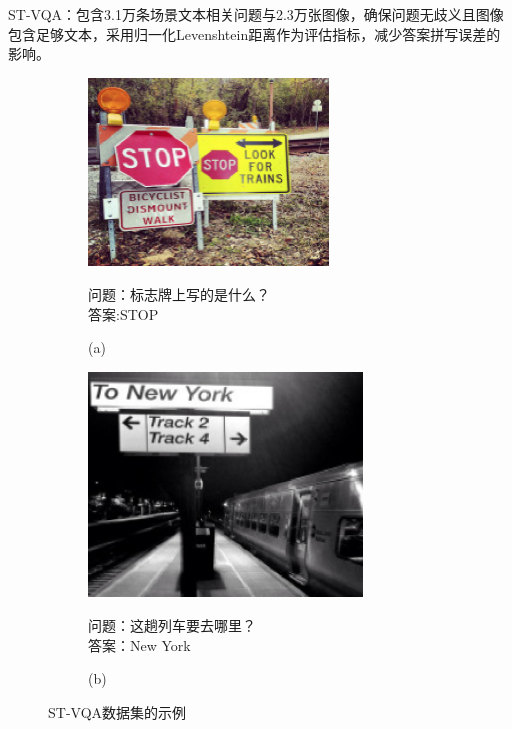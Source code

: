 \begin{enumerate}[nosep]
​ST-VQA\cite{biten2019scene}：包含3.1万条场景文本相关问题与2.3万张图像，确保问题无歧义且图像包含足够文本，采用归一化Levenshtein距离作为评估指标，减少答案拼写误差的影响。
\begin{figure}[h]
    \begin{subfigure}[b]{0.45\textwidth}
        \centering
        \includegraphics[width=0.7\textwidth, keepaspectratio]{figures/STVQA-A.png}
        \begin{center}
            \footnotesize 问题：标志牌上写的是什么？\\
            \footnotesize 答案:STOP\\
        \end{center}
        \caption*{(a)}
    \end{subfigure}
    \hfill
    \begin{subfigure}[b]{0.45\textwidth}
        \centering
        \includegraphics[width=0.8\textwidth, keepaspectratio]{figures/STVQA-B.png}
        \begin{center}
            \footnotesize 问题：这趟列车要去哪里？\\
            \footnotesize 答案：New York\\
        \end{center}
        \caption*{(b)}
    \end{subfigure}
    \caption{ST-VQA数据集的示例}
    \centering
    \label{fig:ST-VQA-example}
\end{figure}
\end{enumerate}  
